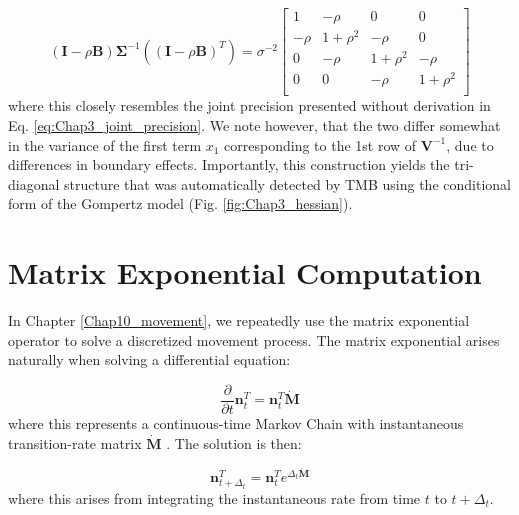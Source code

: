 \begin{equation} 
    (\mathbf{I} - \rho \mathbf{B}) \mathbf{\Sigma}^{-1} ((\mathbf{I} - \rho \mathbf{B})^T) = \sigma^{-2} \begin{bmatrix}
    1 & -\rho & 0 & 0 \\
    -\rho & 1+\rho^2 & -\rho & 0 \\
    0 & -\rho & 1+\rho^2 & -\rho \\
    0 & 0 & -\rho & 1+\rho^2 \\
    \end{bmatrix} 
\end{equation}
where this closely resembles the joint precision presented without derivation in Eq. \ref{eq:Chap3_joint_precision}.  We note however, that the two differ somewhat in the variance of the first term \(x_1\) corresponding to the 1st row of \(\mathbf{V}^{-1}\), due to differences in boundary effects.  Importantly, this construction yields the tri-diagonal structure that was automatically detected by TMB using the conditional form of the Gompertz model (Fig. \ref{fig:Chap3_hessian}).

\section{Matrix Exponential Computation}\label{sec:Appendix_matrix_exponential}

In Chapter \ref{Chap10_movement}, we repeatedly use the matrix exponential operator to solve a discretized movement process.  The matrix exponential arises naturally when solving a differential equation:

\begin{equation} 
    \frac{\partial}{\partial t} \mathbf{n}_t^T = \mathbf{n}_t^T \dot{\mathbf{M}} 
\end{equation}
where this represents a continuous-time Markov Chain with instantaneous transition-rate matrix \(\dot{\mathbf{M}}\) \cite{hanks_continuous-time_2015,thorson_estimating_2021}. The solution is then:

\begin{equation} 
    \mathbf{n}_{t+\Delta_t}^T = \mathbf{n}_t^T e^{\Delta_t \dot{\mathbf{M}}}  
\end{equation}
where this arises from integrating the instantaneous rate from time \(t\) to \(t+\Delta_t\).  


